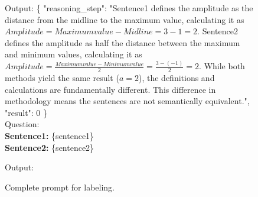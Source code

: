 \documentclass[11pt]{article}
\begin{document}
\begin{figure}[!htbp]
{\begin{tcolorbox}
Output:
\{
    "reasoning\_step": "Sentence1 defines the amplitude as the distance from the midline to the maximum value, calculating it as ${{Amplitude}} = {{Maximum value}} - {{Midline}} = 3 - 1 = 2$. Sentence2 defines the amplitude as half the distance between the maximum and minimum values, calculating it as ${{Amplitude}} = \frac{{{{Maximum value}} - {{Minimum value}}}}{{2}} = \frac{{3 - (-1)}}{{2}} = 2$. While both methods yield the same result ($a = 2$), the definitions and calculations are fundamentally different. This difference in methodology means the sentences are not semantically equivalent.",
    "result": 0
\}\\
Question:\\
\textbf{Sentence1:} 
\{sentence1\}\\
\textbf{Sentence2:}
\{sentence2\}

Output:
\end{tcolorbox}
}
\caption{Complete prompt for labeling.}
\label{prompt}
\end{figure}
\end{document}
